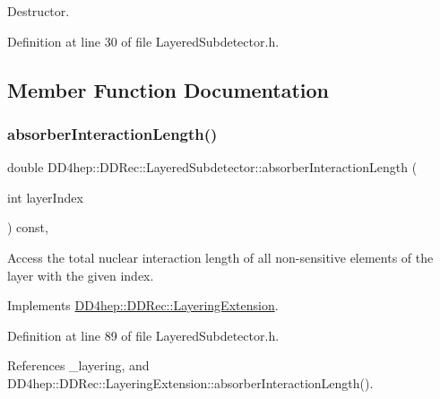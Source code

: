 Destructor. 



Definition at line 30 of file Layered\+Subdetector.\+h.



\subsection{Member Function Documentation}
\hypertarget{class_d_d4hep_1_1_d_d_rec_1_1_layered_subdetector_a8baadf0d30a20c20b4d41d5e2ad1b60c}{}\label{class_d_d4hep_1_1_d_d_rec_1_1_layered_subdetector_a8baadf0d30a20c20b4d41d5e2ad1b60c} 
\subsubsection{\texorpdfstring{absorber\+Interaction\+Length()}{absorberInteractionLength()}}
{\footnotesize\ttfamily double D\+D4hep\+::\+D\+D\+Rec\+::\+Layered\+Subdetector\+::absorber\+Interaction\+Length (\begin{DoxyParamCaption}\item[{int}]{layer\+Index }\end{DoxyParamCaption}) const\hspace{0.3cm}{\ttfamily [inline]}, {\ttfamily [virtual]}}



Access the total nuclear interaction length of all non-\/sensitive elements of the layer with the given index. 



Implements \hyperlink{class_d_d4hep_1_1_d_d_rec_1_1_layering_extension_af18b1293c0631bd55798e7c73eddeb6b}{D\+D4hep\+::\+D\+D\+Rec\+::\+Layering\+Extension}.



Definition at line 89 of file Layered\+Subdetector.\+h.



References \+\_\+layering, and D\+D4hep\+::\+D\+D\+Rec\+::\+Layering\+Extension\+::absorber\+Interaction\+Length().

\hypertarget{class_d_d4hep_1_1_d_d_rec_1_1_layered_subdetector_a598c80799720b7eccd4d9ff747742024}{}\label{class_d_d4hep_1_1_d_d_rec_1_1_layered_subdetector_a598c80799720b7eccd4d9ff747742024} 
